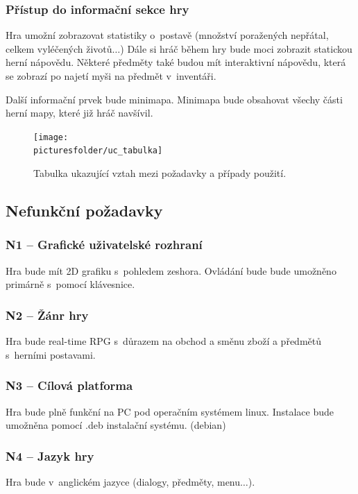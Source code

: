 \documentclass[12pt,a4paper]{article}
\def\picturesfolder{obrazky}
\begin{document}
\subsubsection{Přístup do informační sekce hry}
Hra umožní zobrazovat statistiky o~postavě (množství poražených nepřátal,
celkem vyléčených životů$\dots$) Dále si hráč během hry bude moci zobrazit statickou
herní nápovědu. Některé předměty také budou mít interaktivní nápovědu, která se
zobrazí po najetí myši na předmět v~inventáři.  

Další informační prvek bude minimapa. Minimapa bude obsahovat všechy části herní
mapy, které již hráč navšívil.

\begin{figure}
\begin{center}
  \texttt{[image: \\picturesfolder/uc\_tabulka]}
  \caption{Tabulka ukazující vztah mezi požadavky a případy použití.}
  \label{uc:tabulka}
  \end{center}
\end{figure}

\subsection{Nefunkční požadavky}

\subsubsection{N1 --  Grafické uživatelské rozhraní  }
  Hra bude mít 2D grafiku s~pohledem zeshora. Ovládání bude bude umožněno
  primárně s~pomocí klávesnice.

\subsubsection{N2 -- Žánr hry}
  Hra bude real-time RPG s~důrazem na obchod a směnu zboží a předmětů s~herními
  postavami.

\subsubsection{N3 -- Cílová platforma}
Hra bude plně funkční na PC pod operačním systémem linux. Instalace bude
umožněna pomocí .deb instalační systému. (debian)

\subsubsection{N4 -- Jazyk hry}
Hra bude v~anglickém jazyce (dialogy, předměty, menu$\dots$).
\end{document}
